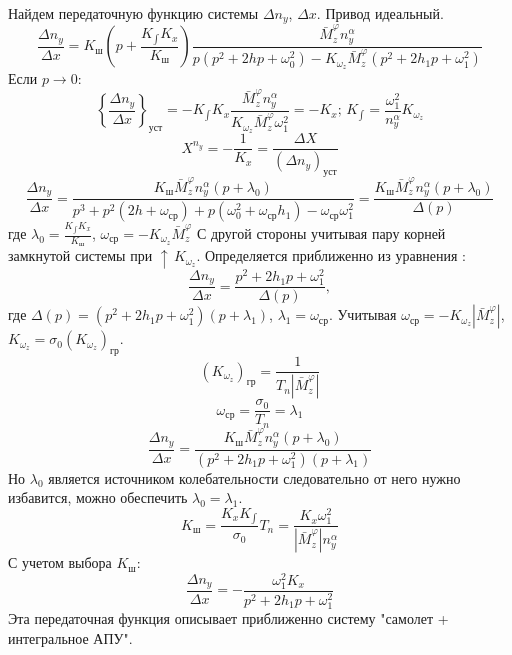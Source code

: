 \documentclass{article}
\begin{document}
Найдем передаточную функцию системы $\Delta n_y$, $\Delta x$. Привод идеальный.
\begin{equation}
	\frac{\Delta n_y}{\Delta x} = K_\text{ш} (p + \frac{K_{\int}
		K_x}{K_\text{ш}}) \frac{\bar{M}_z^{\varphi} n_y^\alpha}{p(p^2 +  2 h p +
	\omega_0^2) - K_{\omega_z} \bar{M}_z^{\varphi} (p^2 + 2h_{1}p +
	\omega_1^2)}
\end{equation}
Если $p \rightarrow 0$:
\[
	\left\{ \frac{\Delta n_y}{\Delta x} \right\}_\text{уст}  = -K_{\int}K_x
	\frac{\bar{M}_z^{\varphi} n_y^\alpha}{K_{\omega_z} \bar{M}_z^{\varphi}
	\omega_1^2} = -K_x; \, K_{\int} = \frac{\omega_1^2}{n_y^\alpha}
	K_{\omega_z}
\]
\[
	X^{n_y} = - \frac{1}{K_x} = \frac{\Delta X}{(\Delta n_y)_\text{уст}}
\]
\[
	\frac{\Delta n_y}{\Delta x} = \frac{K_\text{ш} \bar{M}_z^\varphi
		n_y^\alpha(p + \lambda_0)}{p^3 + p^2 (2h+\omega_\text{ср}) + p (\omega_0^2
		+ \omega_\text{ср} h_1) - \omega_\text{ср} \omega_1^2} = \frac{K_\text{ш}
		\bar{M}_z^\varphi n_y^\alpha(p + \lambda_0)}{\Delta(p)}
\]
где $\lambda_0 = \frac{K_{\int} K_x}{K_\text{ш}}$, $\omega_\text{ср} =
	-K_{\omega_z}\bar{M}_z^\varphi$
С другой стороны учитывая пару корней замкнутой системы при $\uparrow \,
	K_{\omega_z}$. Определяется приближенно из уравнения :
\[
	\frac{\Delta n_y}{\Delta x} = \frac{p^2 + 2 h_1 p + \omega_1^2}{\Delta(p)},
\]
где $\Delta(p) = (p^2 + 2 h_1 p + \omega_1^2)(p + \lambda_1)$, $\lambda_1 =
	\omega_\text{ср}$. Учитывая $\omega_\text{ср} = - K_{\omega_z}
	|\bar{M}_z^\varphi|$, $K_{\omega_z} = \sigma_0 (K_{\omega_z})_\text{гр}$.
\[
	(K_{\omega_z})_\text{гр} = \frac{1}{T_n |\bar{M}_z^\varphi|}
\]
\[
	\omega_\text{ср} = \frac{\sigma_0}{T_n} = \lambda_1
\]
\[
	\frac{\Delta n_y}{\Delta x} = \frac{K_\text{ш} \bar{M}_z^\varphi
		n_y^\alpha(p + \lambda_0)}{(p^2 + 2h_{1} p + \omega_1^2)(p+\lambda_1)}
\]
Но $\lambda_0$ является источником колебательности следовательно от него нужно
избавится, можно обеспечить $\lambda_0 = \lambda_1$.
\[
	K_\text{ш} = \frac{K_{x} K_{\int}}{\sigma_0} T_n = \frac{K_x
		\omega_1^2}{|\bar{M}_z^\varphi| n_y^\alpha}
\]
С учетом выбора $K_\text{ш}$:
\begin{equation}
	\frac{\Delta n_y}{\Delta x} = -\frac{\omega_1^2 K_x}{p^2 + 2 h_1 p +
		\omega_1 ^2}
\end{equation}
Эта передаточная функция описывает приближенно систему "самолет + интегральное
АПУ".
\end{document}
